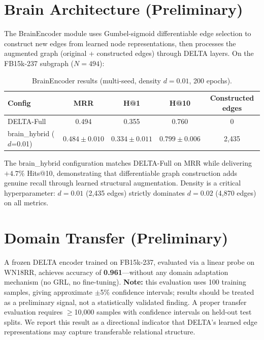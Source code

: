 \documentclass{article}
\begin{document}
\section{Brain Architecture (Preliminary)}
\label{app:brain}

The BrainEncoder module uses Gumbel-sigmoid differentiable edge selection to construct new edges from learned node representations, then processes the augmented graph (original + constructed edges) through DELTA layers. On the FB15k-237 subgraph ($N{=}494$):

\begin{table}[h]
\centering
\caption{BrainEncoder results (multi-seed, density $d{=}0.01$, 200 epochs).}
\begin{tabular}{@{}lcccc@{}}
\toprule
\textbf{Config} & \textbf{MRR} & \textbf{H@1} & \textbf{H@10} & \textbf{Constructed edges} \\
\midrule
DELTA-Full & 0.494 & 0.355 & 0.760 & 0 \\
brain\_hybrid ($d$=0.01) & $0.484 \pm 0.010$ & $0.334 \pm 0.011$ & $\mathbf{0.799 \pm 0.006}$ & 2,435 \\
\bottomrule
\end{tabular}
\end{table}

The brain\_hybrid configuration matches DELTA-Full on MRR while delivering $+4.7\%$ Hits@10, demonstrating that differentiable graph construction adds genuine recall through learned structural augmentation. Density is a critical hyperparameter: $d{=}0.01$ (2,435 edges) strictly dominates $d{=}0.02$ (4,870 edges) on all metrics.

\section{Domain Transfer (Preliminary)}
\label{app:transfer}

A frozen DELTA encoder trained on FB15k-237, evaluated via a linear probe on WN18RR, achieves accuracy of \textbf{0.961}---without any domain adaptation mechanism (no GRL, no fine-tuning). \textbf{Note:} this evaluation uses 100 training samples, giving approximate $\pm$5\% confidence intervals; results should be treated as a preliminary signal, not a statistically validated finding. A proper transfer evaluation requires $\geq$10,000 samples with confidence intervals on held-out test splits. We report this result as a directional indicator that DELTA's learned edge representations may capture transferable relational structure.
\end{document}
